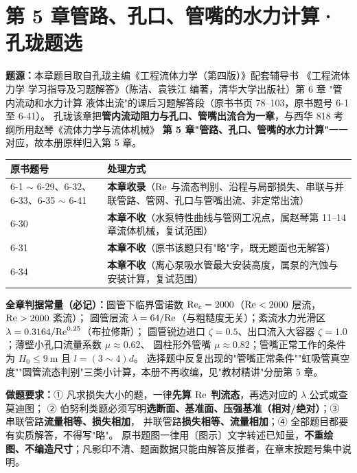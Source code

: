 \chapter*{第 5 章\quad 管路、孔口、管嘴的水力计算·孔珑题选}

\begin{tishi}
\textbf{题源：}本章题目取自孔珑主编《工程流体力学（第四版）》配套辅导书
《工程流体力学 学习指导及习题解答》（陈洁、袁铁江 编著，清华大学出版社）第 6 章
"管内流动和水力计算 液体出流"的课后习题解答段（原书书页 78--103，原书题号 6-1 至 6-41）。
孔珑该章把\textbf{管内流动阻力与孔口、管嘴出流合为一章}，与西华 818 考纲所用赵琴《流体力学与流体机械》
\textbf{第 5 章"管路、孔口、管嘴的水力计算"}一一对应，故本册原样归入第 5 章。

\begin{tabularx}{\linewidth}{@{}lX@{}}
\toprule
原书题号 & 处理方式 \\
\midrule
6-1 $\sim$ 6-29、6-32、6-33、6-35 $\sim$ 6-41 & \textbf{本章收录}（$\mathrm{Re}$ 与流态判别、沿程与局部损失、串联与并联管路、管网、孔口与管嘴出流、非定常出流）\\
6-30 & \textbf{本章不收}（水泵特性曲线与管网工况点，属赵琴第 11--14 章流体机械，复试范围）\\
6-31 & \textbf{本章不收}（原书该题只有"略"字，既无题面也无解答）\\
6-34 & \textbf{本章不收}（离心泵吸水管最大安装高度，属泵的汽蚀与安装计算，复试范围）\\
\bottomrule
\end{tabularx}

\textbf{全章判据常量（必记）：}圆管下临界雷诺数 $\mathrm{Re}_c=2000$（$\mathrm{Re}<2000$ 层流，$\mathrm{Re}>2000$ 紊流）；
圆管层流 $\lambda=64/\mathrm{Re}$（与粗糙度无关）；紊流水力光滑区 $\lambda=0.3164/\mathrm{Re}^{0.25}$（布拉修斯）；
圆管锐边进口 $\zeta=0.5$、出口流入大容器 $\zeta=1.0$；薄壁小孔口流量系数 $\mu\approx0.62$、
圆柱形外管嘴 $\mu\approx0.82$；管嘴正常工作的条件为 $H_0\le9\ \mathrm{m}$ 且 $l=(3\sim4)d$。
选择题中反复出现的"管嘴正常条件""虹吸管真空度""圆管流态判别"三类小计算，本册不再收编，见"教材精讲"分册第 5 章。

\textbf{做题要求：}① 凡求损失大小的题，一律\textbf{先算 $\mathrm{Re}$ 判流态}，再选对应的 $\lambda$ 公式或查莫迪图；
② 伯努利类题必须写明\textbf{选断面、基准面、压强基准（相对/绝对）}；③ 串联管路\textbf{流量相等、损失相加}，
并联管路\textbf{损失相等、流量相加}；④ 全部题目都要有实质解答，不得写"略"。
原书题图一律用〔图示〕文字转述已知量，\textbf{不重绘图、不编造尺寸}；凡影印不清、题面数据只能由解答反推者，在章末按题号集中说明。
\end{tishi}

